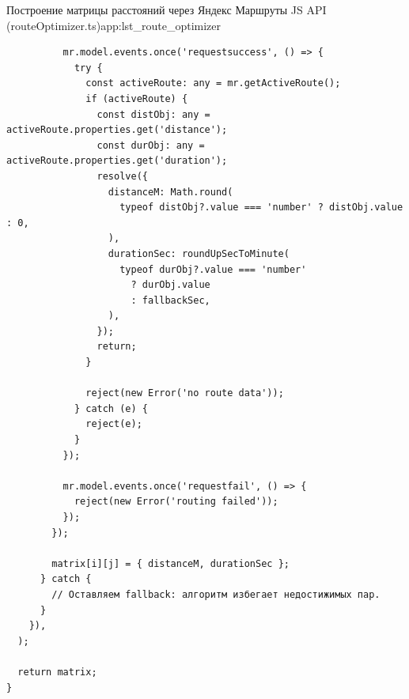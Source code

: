\begin{codelisting}{Построение матрицы расстояний через Яндекс Маршруты JS API (routeOptimizer.ts)}{app:lst_route_optimizer}
\begin{verbatim}
          mr.model.events.once('requestsuccess', () => {
            try {
              const activeRoute: any = mr.getActiveRoute();
              if (activeRoute) {
                const distObj: any = activeRoute.properties.get('distance');
                const durObj: any = activeRoute.properties.get('duration');
                resolve({
                  distanceM: Math.round(
                    typeof distObj?.value === 'number' ? distObj.value : 0,
                  ),
                  durationSec: roundUpSecToMinute(
                    typeof durObj?.value === 'number'
                      ? durObj.value
                      : fallbackSec,
                  ),
                });
                return;
              }

              reject(new Error('no route data'));
            } catch (e) {
              reject(e);
            }
          });

          mr.model.events.once('requestfail', () => {
            reject(new Error('routing failed'));
          });
        });

        matrix[i][j] = { distanceM, durationSec };
      } catch {
        // Оставляем fallback: алгоритм избегает недостижимых пар.
      }
    }),
  );

  return matrix;
}
  \end{verbatim}
\end{codelisting}
